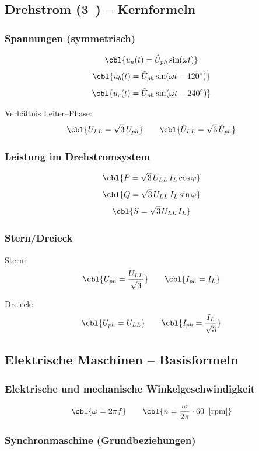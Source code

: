 \subsection{Drehstrom (3~) -- Kernformeln}

\subsubsection{Spannungen (symmetrisch)}

\[
\cbl{u_a(t)=\hat U_{ph}\sin(\omega t)}
\]
\[
\cbl{u_b(t)=\hat U_{ph}\sin(\omega t-120^\circ)}
\]
\[
\cbl{u_c(t)=\hat U_{ph}\sin(\omega t-240^\circ)}
\]

Verhältnis Leiter--Phase:
\[
\cbl{U_{LL} = \sqrt{3}\,U_{ph}}
\qquad
\cbl{\hat U_{LL} = \sqrt{3}\,\hat U_{ph}}
\]

\subsubsection{Leistung im Drehstromsystem}

\[
\cbl{P = \sqrt{3}\,U_{LL}\,I_L\cos\varphi}
\]
\[
\cbl{Q = \sqrt{3}\,U_{LL}\,I_L\sin\varphi}
\]
\[
\cbl{S = \sqrt{3}\,U_{LL}\,I_L}
\]

\subsubsection{Stern/Dreieck}

Stern:
\[
\cbl{U_{ph}=\frac{U_{LL}}{\sqrt{3}}}
\qquad
\cbl{I_{ph}=I_L}
\]

Dreieck:
\[
\cbl{U_{ph}=U_{LL}}
\qquad
\cbl{I_{ph}=\frac{I_L}{\sqrt{3}}}
\]

\subsection{Elektrische Maschinen -- Basisformeln}

\subsubsection{Elektrische und mechanische Winkelgeschwindigkeit}

\[
\cbl{\omega = 2\pi f}
\qquad
\cbl{n = \frac{\omega}{2\pi}\cdot 60 \;\; [\mathrm{rpm}]}
\]

\subsubsection{Synchronmaschine (Grundbeziehungen)}

